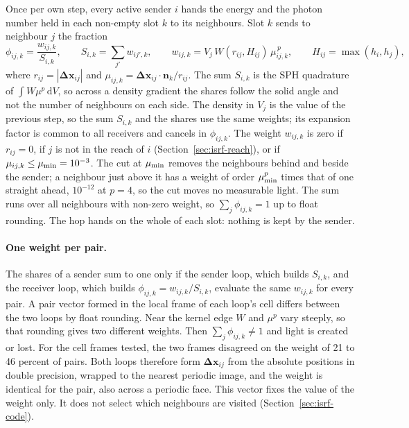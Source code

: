 Once per own step, every active sender $i$ hands the energy and the photon
number held in each non-empty slot $k$ to its neighbours. Slot $k$ sends to
neighbour $j$ the fraction
\begin{equation}
  \phi_{ij,k} = \frac{w_{ij,k}}{S_{i,k}}, \qquad
  S_{i,k}=\sum_{j'} w_{ij',k}, \qquad
  w_{ij,k}=V_j\,W(r_{ij},H_{ij})\,\mu_{ij,k}^{\,p},\qquad
  H_{ij}=\max(h_i,h_j),
  \label{eq:packet-share}
\end{equation}
where $r_{ij}=|\boldsymbol{\Delta x}_{ij}|$ and
$\mu_{ij,k}=\boldsymbol{\Delta x}_{ij}\!\cdot\!\boldsymbol{n}_k/r_{ij}$. The
sum $S_{i,k}$ is the SPH quadrature of $\int W\mu^p\,\mathrm{d}V$, so across a
density gradient the shares follow the solid angle and not the number of
neighbours on each side. The density in $V_j$ is the value of the previous
step, so the sum $S_{i,k}$ and the shares use the same weights; its expansion
factor is common to all receivers and cancels in $\phi_{ij,k}$. The weight
$w_{ij,k}$ is zero if $r_{ij}=0$, if $j$ is not in the reach of $i$
(Section~\ref{sec:isrf-reach}), or if $\mu_{ij,k}\le\mu_{\rm min}=10^{-3}$.
The cut at $\mu_{\rm min}$ removes the neighbours behind and beside the
sender; a neighbour just above it has a weight of order
$\mu_{\rm min}^p$ times that of one straight ahead, $10^{-12}$ at $p=4$, so
the cut moves no measurable light. The sum runs over all neighbours with non-zero weight, so
$\sum_j\phi_{ij,k}=1$ up to float rounding. The hop hands on the whole of each
slot: nothing is kept by the sender.

\paragraph{One weight per pair.}
The shares of a sender sum to one only if the sender loop, which builds
$S_{i,k}$, and the receiver loop, which builds $\phi_{ij,k}=w_{ij,k}/S_{i,k}$,
evaluate the same $w_{ij,k}$ for every pair. A pair vector formed in the local
frame of each loop's cell differs between the two loops by float rounding.
Near the kernel edge $W$ and $\mu^{p}$ vary steeply, so that rounding gives two
different weights. Then $\sum_j\phi_{ij,k}\ne1$ and light is created or lost.
For the cell frames tested, the two frames disagreed on the weight of 21 to 46
percent of pairs. Both loops therefore form $\boldsymbol{\Delta x}_{ij}$ from
the absolute positions in double precision, wrapped to the nearest periodic
image, and the weight is identical for the pair, also across a periodic face.
This vector fixes the value of the weight only. It does not select which
neighbours are visited (Section~\ref{sec:isrf-code}).

